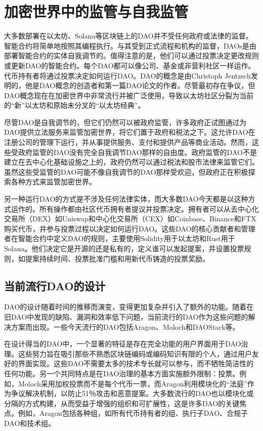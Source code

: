 \documentclass[main.tex]{subfiles}
\begin{document}
\section{加密世界中的监管与自我监管}

大多数部署在以太坊、Solana等区块链上的DAO并不受任何政府或法律的监督。智能合约将简单地按照其编程执行。与其受到正式流程和机构的监督，DAOs是由部署智能合约的实体自我调节的。值得注意的是，他们可以通过投票决定更改规则或更新DAO的智能合约。每个DAO都可以像公司、基金或非营利社区一样运作。代币持有者将通过投票决定如何运行DAO。DAO的概念是由Christoph Jentzsch发明的\cite{dao_paper}，他是DAO概念的创造者和第一篇DAO论文的作者。尽管最初存在争议，但DAO概念现在在加密世界中非常流行并被广泛使用，导致以太坊社区分裂为当前的“新”以太坊和原始未分叉的“以太坊经典”。

尽管DAO是自我调节的，但它们仍然可以被政府监管，许多政府正试图通过为DAO提供立法服务来监管加密世界，将它们置于政府和税法之下。这允许DAO在注册公司的管理下运行，并从事提供服务、支付和提供产品等商业活动。然而，这些受政府监管的DAO没有完全自我调节DAO那样的自由度。政府监管的DAO不是建立在去中心化基础设施之上的，政府仍然可以通过税法和股市法律来监管它们。虽然这些受监管的DAO可能不像自我调节的DAO那样受欢迎，但政府正在积极探索各种方式来监管加密世界。

另一种运行DAO的方式是不涉及任何法律实体，而大多数DAO今天都是以这种方式运作的。所有操作都由社区代币拥有者提议并投票决定。拥有者可以从去中心化交易所（DEX）如Uniswap和中心化交易所（CEX）如Coinbase、Binance和FTX购买代币，并参与投票过程以决定如何运行DAO。这些DAO的核心贡献者和管理者在智能合约中定义DAO的规则，主要使用Solidity用于以太坊和Rust用于Solana。他们决定它是开源的还是私有的，定义谁可以发起提案，并设置投票规则，如提案持续时间、投票批准门槛和用新代币铸造的投票奖励。

\subsection{当前流行DAO的设计}

DAO的设计随着时间的推移而演变，变得更加复杂并引入了额外的功能。随着在旧DAO中发现的缺陷、漏洞和效率低下问题，当前流行的DAO作为这些问题的解决方案而出现。一些今天流行的DAO包括Aragon、Moloch和DAOStack等。

在设计得当的DAO中，一个显著的特征是存在完全功能的用户界面用于DAO治理。这些努力旨在吸引那些不熟悉区块链编码或编码知识有限的个人，通过用户友好的界面实现。这些DAO不需要太多的技术专长就可以参与，而不牺牲简洁性的任何功能。另一个共同特点是在DAO治理的基本方面实施额外限制：投票。例如，Moloch采用加权投票而不是每个代币一票，而Aragon利用模块化的“法庭”作为争议解决机制，以防止51％攻击和恶意提案。大多数流行的DAO也以模块化或分隔的方式构建，从而受益于增强的组织和可扩展性，这是许多DAO的关键焦点。例如，Aragon包括各种组，如所有代币持有者的组、执行子DAO、合规子DAO和技术组。
\end{document}
